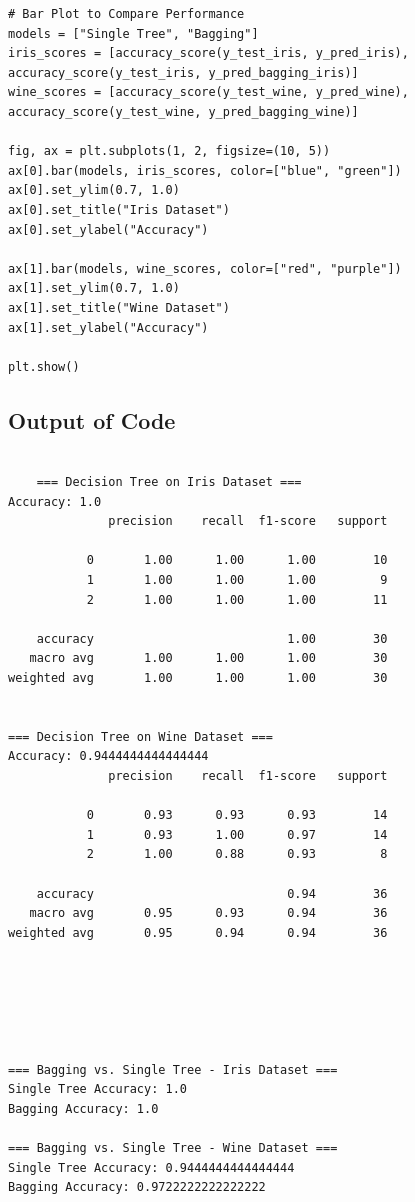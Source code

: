 \documentclass[a4paper,12pt]{article}
\begin{document}
\begin{lstlisting}[style=python]
# Bar Plot to Compare Performance
models = ["Single Tree", "Bagging"]
iris_scores = [accuracy_score(y_test_iris, y_pred_iris), accuracy_score(y_test_iris, y_pred_bagging_iris)]
wine_scores = [accuracy_score(y_test_wine, y_pred_wine), accuracy_score(y_test_wine, y_pred_bagging_wine)]

fig, ax = plt.subplots(1, 2, figsize=(10, 5))
ax[0].bar(models, iris_scores, color=["blue", "green"])
ax[0].set_ylim(0.7, 1.0)
ax[0].set_title("Iris Dataset")
ax[0].set_ylabel("Accuracy")

ax[1].bar(models, wine_scores, color=["red", "purple"])
ax[1].set_ylim(0.7, 1.0)
ax[1].set_title("Wine Dataset")
ax[1].set_ylabel("Accuracy")

plt.show()
\end{lstlisting}

\subsection{Output of Code}
\begin{verbatim}

    === Decision Tree on Iris Dataset ===
Accuracy: 1.0
              precision    recall  f1-score   support

           0       1.00      1.00      1.00        10
           1       1.00      1.00      1.00         9
           2       1.00      1.00      1.00        11

    accuracy                           1.00        30
   macro avg       1.00      1.00      1.00        30
weighted avg       1.00      1.00      1.00        30


=== Decision Tree on Wine Dataset ===
Accuracy: 0.9444444444444444
              precision    recall  f1-score   support

           0       0.93      0.93      0.93        14
           1       0.93      1.00      0.97        14
           2       1.00      0.88      0.93         8

    accuracy                           0.94        36
   macro avg       0.95      0.93      0.94        36
weighted avg       0.95      0.94      0.94        36






=== Bagging vs. Single Tree - Iris Dataset ===
Single Tree Accuracy: 1.0
Bagging Accuracy: 1.0

=== Bagging vs. Single Tree - Wine Dataset ===
Single Tree Accuracy: 0.9444444444444444
Bagging Accuracy: 0.9722222222222222

\end{verbatim}
\end{document}
